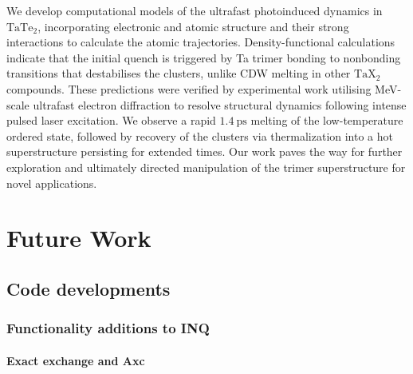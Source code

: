 We develop computational models of the ultrafast photoinduced dynamics in \(\mathrm{TaTe_2}\), incorporating  electronic and atomic structure and their strong interactions to calculate the atomic trajectories. 
Density-functional calculations indicate that the initial quench is triggered by Ta trimer bonding to nonbonding transitions that destabilises the clusters, unlike CDW melting in other \(\mathrm{TaX_2}\) compounds. 
These predictions were verified by experimental work utilising MeV-scale ultrafast electron diffraction to resolve structural dynamics following intense pulsed laser excitation. 
We observe a rapid \(1.4~\mathrm{ps}\) melting of the low-temperature ordered state, followed by recovery of the clusters via thermalization into a hot superstructure persisting for extended times.
Our work paves the way for further exploration and ultimately directed manipulation of the trimer superstructure for novel applications.

\section{Future Work}

\subsection{Code developments}

\subsubsection{Functionality additions to INQ}

\paragraph{Exact exchange and Axc}

